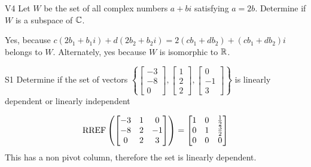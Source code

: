 \documentclass{sbgLAexam}
\begin{document}
\begin{problem}{V4} Let \(W\) be the set of all complex numbers \(a+bi\)
satisfying  \(a=2b\).
Determine if \(W\) is a subspace of \(\mathbb{C}\).
\end{problem}
\begin{solution}
Yes, because \(c(2b_1+b_1i)+d(2b_2+b_2i)=2(cb_1+db_2)+(cb_1+db_2)i\) belongs to
\(W\). Alternately, yes because \(W\) is isomorphic to \(\mathbb{R}\).
\end{solution}
\begin{extract}\newpage\end{extract}
\begin{problem}{S1}
Determine if the set of vectors $\left\{ \begin{bmatrix} -3 \\ -8 \\ 0 \end{bmatrix}, \begin{bmatrix} 1 \\ 2 \\ 2 \end{bmatrix}, \begin{bmatrix} 0 \\ -1 \\ 3 \end{bmatrix} \right\}$ is  linearly dependent or linearly independent
\end{problem}
\begin{solution}
$$\operatorname{RREF}\left( \begin{bmatrix}-3 & 1 & 0 \\ -8 & 2 & -1 \\ 0 & 2 & 3 \end{bmatrix}\right) = \begin{bmatrix} 1 & 0 & \frac{1}{2} \\ 0 & 1 & \frac{3}{2} \\ 0 & 0 & 0 \end{bmatrix}$$ 
This has a non pivot column, therefore the set is linearly dependent.
\end{solution}
\end{document}
